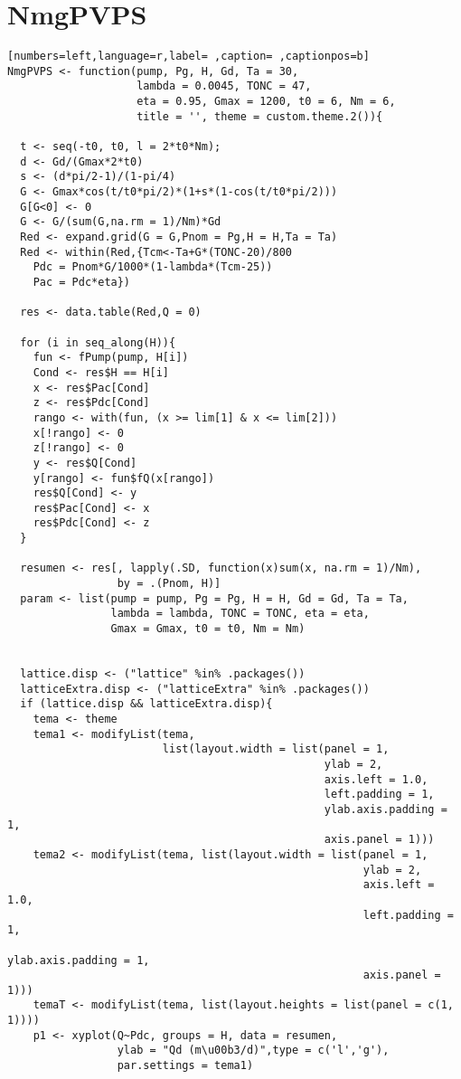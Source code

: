\section{NmgPVPS}
\label{sec:orgd81e8e1}
\begin{lstlisting}[numbers=left,language=r,label= ,caption= ,captionpos=b]
NmgPVPS <- function(pump, Pg, H, Gd, Ta = 30,
                    lambda = 0.0045, TONC = 47,
                    eta = 0.95, Gmax = 1200, t0 = 6, Nm = 6,
                    title = '', theme = custom.theme.2()){

  t <- seq(-t0, t0, l = 2*t0*Nm);
  d <- Gd/(Gmax*2*t0)
  s <- (d*pi/2-1)/(1-pi/4)
  G <- Gmax*cos(t/t0*pi/2)*(1+s*(1-cos(t/t0*pi/2)))
  G[G<0] <- 0
  G <- G/(sum(G,na.rm = 1)/Nm)*Gd
  Red <- expand.grid(G = G,Pnom = Pg,H = H,Ta = Ta)
  Red <- within(Red,{Tcm<-Ta+G*(TONC-20)/800
    Pdc = Pnom*G/1000*(1-lambda*(Tcm-25))
    Pac = Pdc*eta})                    

  res <- data.table(Red,Q = 0)

  for (i in seq_along(H)){
    fun <- fPump(pump, H[i])
    Cond <- res$H == H[i]
    x <- res$Pac[Cond]
    z <- res$Pdc[Cond]
    rango <- with(fun, (x >= lim[1] & x <= lim[2])) 
    x[!rango] <- 0
    z[!rango] <- 0
    y <- res$Q[Cond]
    y[rango] <- fun$fQ(x[rango])
    res$Q[Cond] <- y
    res$Pac[Cond] <- x
    res$Pdc[Cond] <- z
  }

  resumen <- res[, lapply(.SD, function(x)sum(x, na.rm = 1)/Nm),
                 by = .(Pnom, H)]
  param <- list(pump = pump, Pg = Pg, H = H, Gd = Gd, Ta = Ta,
                lambda = lambda, TONC = TONC, eta = eta,
                Gmax = Gmax, t0 = t0, Nm = Nm)


  lattice.disp <- ("lattice" %in% .packages())
  latticeExtra.disp <- ("latticeExtra" %in% .packages())
  if (lattice.disp && latticeExtra.disp){
    tema <- theme
    tema1 <- modifyList(tema,
                        list(layout.width = list(panel = 1,
                                                 ylab = 2,
                                                 axis.left = 1.0,
                                                 left.padding = 1,
                                                 ylab.axis.padding = 1,
                                                 axis.panel = 1)))
    tema2 <- modifyList(tema, list(layout.width = list(panel = 1,
                                                       ylab = 2,
                                                       axis.left = 1.0,
                                                       left.padding = 1,
                                                       ylab.axis.padding = 1,
                                                       axis.panel = 1)))
    temaT <- modifyList(tema, list(layout.heights = list(panel = c(1, 1))))
    p1 <- xyplot(Q~Pdc, groups = H, data = resumen,
                 ylab = "Qd (m\u00b3/d)",type = c('l','g'),
                 par.settings = tema1)


\end{lstlisting}
